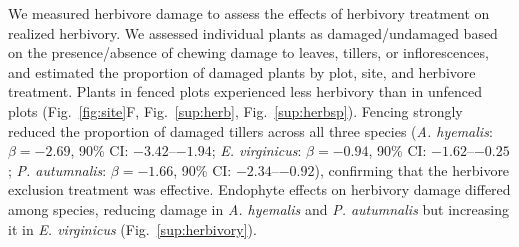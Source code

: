 \documentclass[12pt]{article}\usepackage[]{graphicx}\usepackage[dvipsnames]{xcolor}
\begin{document}
We measured herbivore damage to assess the effects of herbivory treatment on realized herbivory.
We assessed individual plants as damaged/undamaged based on the presence/absence of chewing damage to leaves, tillers, or inflorescences, and estimated the proportion of damaged plants by plot, site, and herbivore treatment.
Plants in fenced plots experienced less herbivory than in unfenced plots (Fig.~\ref{fig:site}F, Fig.~\ref{sup:herb}, Fig.~\ref{sup:herbsp}).
Fencing strongly reduced the proportion of damaged tillers across all three species (\textit{A. hyemalis}: $\beta = -2.69$, 90\% CI: $-3.42$--$-1.94$; \textit{E. virginicus}: $\beta = -0.94$, 90\% CI: $-1.62$--$-0.25$; \textit{P. autumnalis}: $\beta = -1.66$, 90\% CI: $-2.34$--$-0.92$), confirming that the herbivore exclusion treatment was effective. 
Endophyte effects on herbivory damage differed among species, reducing damage in \textit{A. hyemalis} and \textit{P. autumnalis} but increasing it in \textit{E. virginicus} (Fig.~\ref{sup:herbivory}).
\end{document}
